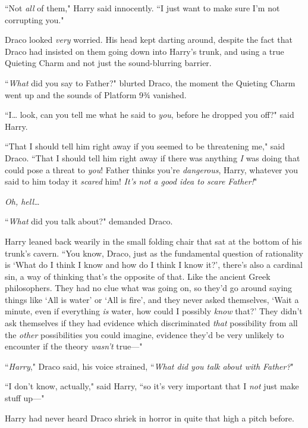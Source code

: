 ``Not \emph{all} of them," Harry said innocently. ``I just want to make sure I'm not corrupting you."

\later

Draco looked \emph{very} worried. His head kept darting around, despite the fact that Draco had insisted on them going down into Harry's trunk, and using a true Quieting Charm and not just the sound-blurring barrier.

``\emph{What} did you say to Father?" blurted Draco, the moment the Quieting Charm went up and the sounds of Platform 9¾ vanished.

``I{\ldots} look, can you tell me what he said to \emph{you}, before he dropped you off?" said Harry.

``That I should tell him right away if you seemed to be threatening me," said Draco. ``That I should tell him right away if there was anything \emph{I} was doing that could pose a threat to \emph{you}! Father thinks you're \emph{dangerous}, Harry, whatever you said to him today it \emph{scared} him! \emph{It's not a good idea to scare Father!}"

\emph{Oh, hell{\ldots}}

``\emph{What} did you talk about?" demanded Draco.

Harry leaned back wearily in the small folding chair that sat at the bottom of his trunk's cavern. ``You know, Draco, just as the fundamental question of rationality is `What do I think I know and how do I think I know it?', there's also a cardinal sin, a way of thinking that's the opposite of that. Like the ancient Greek philosophers. They had no clue what was going on, so they'd go around saying things like `All is water' or `All is fire', and they never asked themselves, `Wait a minute, even if everything \emph{is} water, how could I possibly \emph{know} that?' They didn't ask themselves if they had evidence which discriminated \emph{that} possibility from all the \emph{other} possibilities you could imagine, evidence they'd be very unlikely to encounter if the theory \emph{wasn't} true---"

``\emph{Harry}," Draco said, his voice strained, ``\emph{What did you talk about with Father?}"

``I don't know, actually," said Harry, ``so it's very important that I \emph{not} just make stuff up---"

Harry had never heard Draco shriek in horror in quite that high a pitch before.

